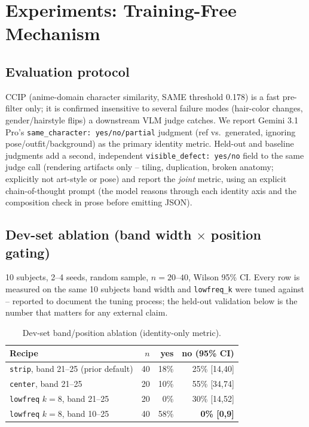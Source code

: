 \section{Experiments: Training-Free Mechanism}\label{sec:results-tf}

\subsection{Evaluation protocol}\label{sec:protocol}

CCIP (anime-domain character similarity, SAME threshold 0.178) is a fast
pre-filter only; it is confirmed insensitive to several failure modes
(hair-color changes, gender/hairstyle flips) a downstream VLM judge
catches. We report Gemini 3.1 Pro's \texttt{same\_character: yes/no/partial}
judgment (ref vs.\ generated, ignoring pose/outfit/background) as the
primary identity metric. Held-out and baseline judgments add a second,
independent \texttt{visible\_defect: yes/no} field to the same judge call
(rendering artifacts only -- tiling, duplication, broken anatomy;
explicitly not art-style or pose) and report the \emph{joint} metric,
using an explicit chain-of-thought prompt (the model reasons through each
identity axis and the composition check in prose before emitting JSON).

\subsection{Dev-set ablation (band width $\times$ position gating)}\label{sec:devablation}

10 subjects, 2--4 seeds, random sample, $n{=}20$--$40$, Wilson 95\% CI.
Every row is measured on the same 10 subjects band width and
\texttt{lowfreq\_k} were tuned against -- reported to document the tuning
process; the held-out validation below is the number that matters for
any external claim.

\begin{table}[t]
\centering\small
\begin{tabular}{@{}lrrr@{}}
\toprule
Recipe & $n$ & yes & no (95\% CI) \\
\midrule
\texttt{strip}, band 21--25 (prior default) & 40 & 18\% & 25\% [14,40] \\
\texttt{center}, band 21--25 & 20 & 10\% & 55\% [34,74] \\
\texttt{lowfreq} $k{=}8$, band 21--25 & 20 & 0\% & 30\% [14,52] \\
\texttt{lowfreq} $k{=}8$, band 10--25 & 40 & 58\% & \textbf{0\% [0,9]} \\
\bottomrule
\end{tabular}
\caption{Dev-set band/position ablation (identity-only metric).}
\label{tab:devablation}
\end{table}

